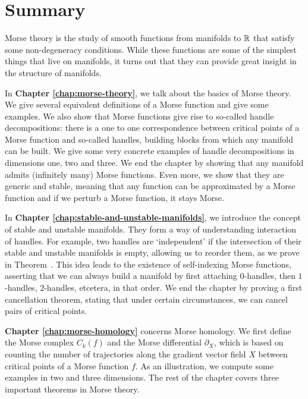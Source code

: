 \chapter*{Summary}
\label{ch:summary}

Morse theory is the study of smooth functions from manifolds to $\mathbb{R}$ that satisfy some non-degeneracy conditions. While these functions are some of the simplest things that live on manifolds, it turns out that they can provide great insight in the structure of manifolds.

In \textbf{Chapter \ref{chap:morse-theory}}, we talk about the basics of Morse theory.
We give several equivalent definitions of a Morse function and give some examples.
We also show that Morse functions give rise to so-called handle decompositions: there is a one to one correspondence between critical points of a Morse function and so-called handles, building blocks from which any manifold can be built.
We give some very concrete examples of handle decompositions in dimensions one, two and three.
We end the chapter by showing that any manifold admits (infinitely many) Morse functions.
Even more, we show that they are generic and stable, meaning that any function can be approximated by a Morse function and if we perturb a Morse function, it stays Morse.


In \textbf{Chapter \ref{chap:stable-and-unstable-manifolds}}, we introduce the concept of stable and unstable manifolds.
They form a way of understanding interaction of handles.
For example, two handles are `independent' if the intersection of their stable and unstable manifolds is empty, allowing us to reorder them, as we prove in Theorem~\label{thm:reordening}.
This idea leads to the existence of self-indexing Morse functions, asserting that we can always build a manifold by first attaching $0$-handles, then $1$-handles, $2$-handles, etcetera, in that order.
We end the chapter by proving a first cancellation theorem, stating that under certain circumstances, we can cancel pairs of critical points.

\textbf{Chapter \ref{chap:morse-homology}} concerns Morse homology.
We first define the Morse complex $C_k(f)$ and the Morse differential $\partial_X$, which is based on counting the number of trajectories along the gradient vector field $X$ between critical points of a Morse function $f$.
As an illustration, we compute some examples in two and three dimensions.
The rest of the chapter covers three important theorems in Morse theory.

